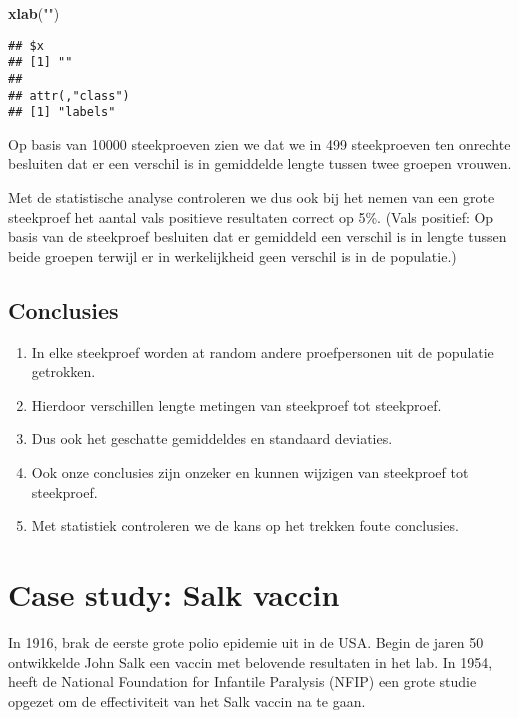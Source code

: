 \documentclass[
  12pt,dutch,coursenotes]{book}
\newenvironment{Shaded}{\begin{snugshade}}{\end{snugshade}}
\newcommand{\KeywordTok}[1]{\textcolor[rgb]{0.13,0.29,0.53}{\textbf{#1}}}
\newcommand{\NormalTok}[1]{#1}
\newcommand{\StringTok}[1]{\textcolor[rgb]{0.31,0.60,0.02}{#1}}
\theoremstyle{definition}
\theoremstyle{definition}
\theoremstyle{definition}
\theoremstyle{remark}
\begin{document}
\begin{Shaded}
\begin{Highlighting}[]
\KeywordTok{xlab}\NormalTok{(}\StringTok{""}\NormalTok{)}
\end{Highlighting}
\end{Shaded}

\begin{verbatim}
## $x
## [1] ""
## 
## attr(,"class")
## [1] "labels"
\end{verbatim}

Op basis van 10000 steekproeven zien we dat we in 499 steekproeven ten onrechte besluiten dat er een verschil is in gemiddelde lengte tussen twee groepen vrouwen.

Met de statistische analyse controleren we dus ook bij het nemen van een grote steekproef het aantal vals positieve resultaten correct op 5\%. (Vals positief: Op basis van de steekproef besluiten dat er gemiddeld een verschil is in lengte tussen beide groepen terwijl er in werkelijkheid geen verschil is in de populatie.)

\hypertarget{conclusies}{%
\subsection{Conclusies}\label{conclusies}}

\begin{enumerate}
\def\labelenumi{\arabic{enumi}.}
\item
  In elke steekproef worden at random andere proefpersonen uit de populatie getrokken.
\item
  Hierdoor verschillen lengte metingen van steekproef tot steekproef.
\item
  Dus ook het geschatte gemiddeldes en standaard deviaties.
\item
  Ook onze conclusies zijn onzeker en kunnen wijzigen van steekproef tot steekproef.
\item
  Met statistiek controleren we de kans op het trekken foute conclusies.
\end{enumerate}

\hypertarget{case-study-salk-vaccin}{%
\section{Case study: Salk vaccin}\label{case-study-salk-vaccin}}

In 1916, brak de eerste grote polio epidemie uit in de USA.
Begin de jaren 50 ontwikkelde John Salk een vaccin met belovende resultaten in het lab.
In 1954, heeft de National Foundation for Infantile Paralysis (NFIP) een grote studie opgezet om de effectiviteit van het Salk vaccin na te gaan.
\end{document}
